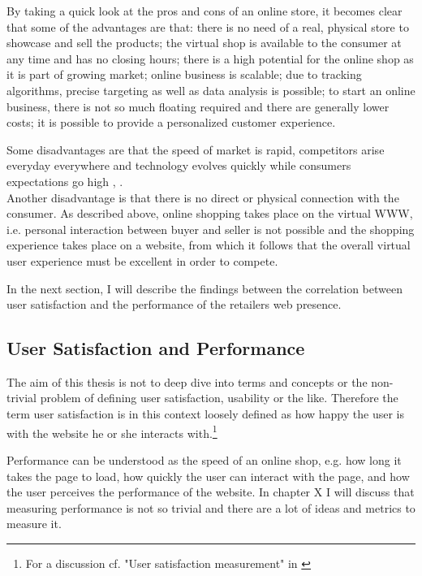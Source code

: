 By taking a quick look at the pros and cons of an online store, it becomes clear that some of the advantages are that: there is no need of a real, physical store to showcase and sell the products; the virtual shop is available to the consumer at any time and has no closing hours; there is a high potential for the online shop as it is part of growing market; online business is scalable; due to tracking algorithms, precise targeting as well as data analysis is possible; to start an online business, there is not so much floating required and there are generally lower costs; it is possible to provide a personalized customer experience.

Some disadvantages are that the speed of market is rapid, competitors arise everyday everywhere and technology evolves quickly while consumers expectations go high \cite{2019Hermogeno}, \cite{2020Lang}.
\\

Another disadvantage is that there is no direct or physical connection with the consumer.
As described above, online shopping takes place on the virtual WWW, i.e. personal interaction between buyer and seller is not possible and the shopping experience takes place on a website, from which it follows that the overall virtual user experience must be excellent in order to compete.

In the next section, I will describe the findings between the correlation between user satisfaction and the performance of the retailers web presence.





\subsection{User Satisfaction and Performance}
\label{chapter:user_satisfaction}

The aim of this thesis is not to deep dive into terms and concepts or the non-trivial problem of defining user satisfaction, usability or the like.
Therefore the term user satisfaction is in this context loosely defined as how happy the user is with the website he or she interacts with.\footnote{For a discussion cf. "User satisfaction measurement" in \cite{2010Islam}}

Performance can be understood as the speed of an online shop, e.g. how long it takes the page to load, how quickly the user can interact with the page, and how the user perceives the performance of the website.
In chapter X I will discuss that measuring performance is not so trivial and there are a lot of ideas and metrics to measure it. %


